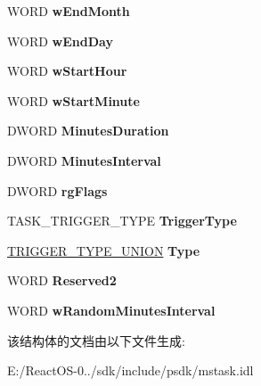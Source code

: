 \begin{DoxyCompactItemize}
W\+O\+RD {\bfseries w\+End\+Month}
\item 
\mbox{\label{struct_i_task_trigger_1_1___t_a_s_k___t_r_i_g_g_e_r_ac69122b393593c92fe5a3fdcd6e4d87c}} 
W\+O\+RD {\bfseries w\+End\+Day}
\item 
\mbox{\label{struct_i_task_trigger_1_1___t_a_s_k___t_r_i_g_g_e_r_a9c3e3a642db3a1bb8ee36f47fa1d7329}} 
W\+O\+RD {\bfseries w\+Start\+Hour}
\item 
\mbox{\label{struct_i_task_trigger_1_1___t_a_s_k___t_r_i_g_g_e_r_a713f0455080570a5421489aecace67e7}} 
W\+O\+RD {\bfseries w\+Start\+Minute}
\item 
\mbox{\label{struct_i_task_trigger_1_1___t_a_s_k___t_r_i_g_g_e_r_a45853c619d6efab8565a5de230f3b24f}} 
D\+W\+O\+RD {\bfseries Minutes\+Duration}
\item 
\mbox{\label{struct_i_task_trigger_1_1___t_a_s_k___t_r_i_g_g_e_r_ab12675f39bf2e7880aaf056ffbbdf897}} 
D\+W\+O\+RD {\bfseries Minutes\+Interval}
\item 
\mbox{\label{struct_i_task_trigger_1_1___t_a_s_k___t_r_i_g_g_e_r_ad1a23a95646a534ccd3d07e7614aef5f}} 
D\+W\+O\+RD {\bfseries rg\+Flags}
\item 
\mbox{\label{struct_i_task_trigger_1_1___t_a_s_k___t_r_i_g_g_e_r_a91dbe66a1e74545733a4394348df1b15}} 
T\+A\+S\+K\+\_\+\+T\+R\+I\+G\+G\+E\+R\+\_\+\+T\+Y\+PE {\bfseries Trigger\+Type}
\item 
\mbox{\label{struct_i_task_trigger_1_1___t_a_s_k___t_r_i_g_g_e_r_adbcdaa36505f53c6b73a29ff711bd5b8}} 
\hyperlink{union_i_task_trigger_1_1___t_r_i_g_g_e_r___t_y_p_e___u_n_i_o_n}{T\+R\+I\+G\+G\+E\+R\+\_\+\+T\+Y\+P\+E\+\_\+\+U\+N\+I\+ON} {\bfseries Type}
\item 
\mbox{\label{struct_i_task_trigger_1_1___t_a_s_k___t_r_i_g_g_e_r_a25d0d83a66609466f85be151389e6273}} 
W\+O\+RD {\bfseries Reserved2}
\item 
\mbox{\label{struct_i_task_trigger_1_1___t_a_s_k___t_r_i_g_g_e_r_a8e5810200948d39726d0b196e9b38722}} 
W\+O\+RD {\bfseries w\+Random\+Minutes\+Interval}
\end{DoxyCompactItemize}


该结构体的文档由以下文件生成\+:\begin{DoxyCompactItemize}
\item 
E\+:/\+React\+O\+S-\/0../sdk/include/psdk/mstask.\+idl\end{DoxyCompactItemize}
